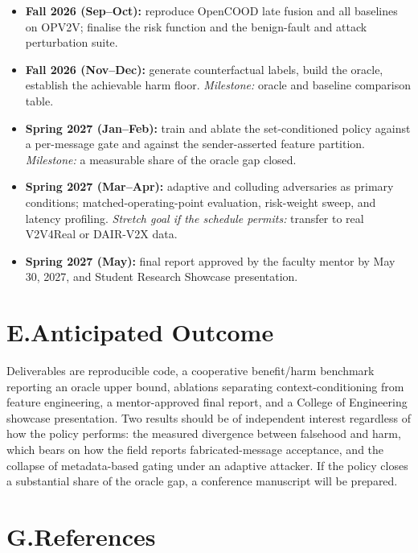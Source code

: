 \documentclass[11pt]{article}
\begin{document}
\begin{itemize}
  \item \textbf{Fall 2026 (Sep--Oct):} reproduce OpenCOOD late fusion and all
    baselines on OPV2V; finalise the risk function and the benign-fault and
    attack perturbation suite.
  \item \textbf{Fall 2026 (Nov--Dec):} generate counterfactual labels, build the
    oracle, establish the achievable harm floor. \emph{Milestone:} oracle and
    baseline comparison table.
  \item \textbf{Spring 2027 (Jan--Feb):} train and ablate the set-conditioned
    policy against a per-message gate and against the sender-asserted feature
    partition. \emph{Milestone:} a measurable share of the oracle gap closed.
  \item \textbf{Spring 2027 (Mar--Apr):} adaptive and colluding adversaries as
    primary conditions; matched-operating-point evaluation, risk-weight sweep,
    and latency profiling. \emph{Stretch goal if the schedule permits:} transfer
    to real V2V4Real or DAIR-V2X data.
  \item \textbf{Spring 2027 (May):} final report approved by the faculty mentor
    by May 30, 2027, and Student Research Showcase presentation.
\end{itemize}

\section{E.\quad Anticipated Outcome}

Deliverables are reproducible code, a cooperative benefit/harm benchmark
reporting an oracle upper bound, ablations separating context-conditioning from
feature engineering, a mentor-approved final report, and a College of
Engineering showcase presentation. Two results should be of independent interest
regardless of how the policy performs: the measured divergence between falsehood
and harm, which bears on how the field reports fabricated-message acceptance,
and the collapse of metadata-based gating under an adaptive attacker. If the
policy closes a substantial share of the oracle gap, a conference manuscript
will be prepared.

\section{G.\quad References}
\end{document}
